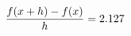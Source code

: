 \documentclass[preview]{standalone}
\begin{document}
\begin{align*}
\special{dvisvgm:raw <g id='unique000'>}\frac{f(x+h)-f(x)}{h} = 2.127\special{dvisvgm:raw </g>}
\end{align*}
\end{document}
